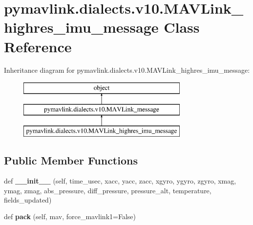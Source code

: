 \hypertarget{classpymavlink_1_1dialects_1_1v10_1_1MAVLink__highres__imu__message}{}\section{pymavlink.\+dialects.\+v10.\+M\+A\+V\+Link\+\_\+highres\+\_\+imu\+\_\+message Class Reference}
\label{classpymavlink_1_1dialects_1_1v10_1_1MAVLink__highres__imu__message}
Inheritance diagram for pymavlink.\+dialects.\+v10.\+M\+A\+V\+Link\+\_\+highres\+\_\+imu\+\_\+message\+:\begin{figure}[H]
\begin{center}
\leavevmode
\includegraphics[height=3.000000cm]{classpymavlink_1_1dialects_1_1v10_1_1MAVLink__highres__imu__message}
\end{center}
\end{figure}
\subsection*{Public Member Functions}
\begin{DoxyCompactItemize}
\item 
\mbox{\label{classpymavlink_1_1dialects_1_1v10_1_1MAVLink__highres__imu__message_a67827e3c298b687f3a363b68cba811f1}} 
def {\bfseries \+\_\+\+\_\+init\+\_\+\+\_\+} (self, time\+\_\+usec, xacc, yacc, zacc, xgyro, ygyro, zgyro, xmag, ymag, zmag, abs\+\_\+pressure, diff\+\_\+pressure, pressure\+\_\+alt, temperature, fields\+\_\+updated)
\item 
\mbox{\label{classpymavlink_1_1dialects_1_1v10_1_1MAVLink__highres__imu__message_a448b46aed863837be0d442ae91cfb37f}} 
def {\bfseries pack} (self, mav, force\+\_\+mavlink1=False)
\end{DoxyCompactItemize}
